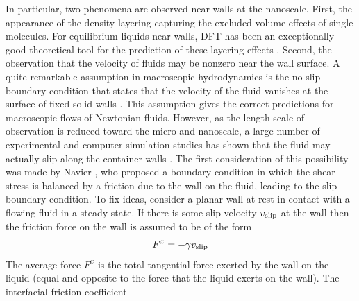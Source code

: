 \documentclass[b5paper,openright,10pt]{book}
\newcommand{\Note}[1]{{\bf \color{red}#1}}    %
\begin{document}
In  particular,  two phenomena  are
observed near  walls at the  nanoscale.  First, the appearance  of the
density  layering  capturing the  excluded  volume  effects of  single
molecules.   For equilibrium  liquids near  walls, 
DFT has  been an exceptionally good theoretical  tool for the
prediction of  these layering effects \cite{Hansen2013}.   Second, the
observation that the velocity of fluids  may be nonzero near the wall
surface.
A quite remarkable  assumption in macroscopic hydrodynamics  is the no
slip boundary  condition that  states that the  velocity of  the fluid
vanishes  at the  surface of  fixed solid  walls \cite{Batcherlor1967}.
This assumption gives the correct predictions for macroscopic flows of
Newtonian  fluids.  However,  as the  length scale  of observation  is
reduced  toward   the  micro  and   nanoscale,  a  large   number  of
experimental   \cite{Lauga2005}   and  computer   simulation   studies
\cite{Koplik1995} has shown that the fluid may actually slip along the
container walls  \cite{KarniadakisBook2005}.  The  first consideration
of this possibility was made  by Navier \cite{Navier1827}, who proposed
a  boundary condition  in  which the  shear stress  is  balanced by  a
friction due  to the wall on  the fluid, leading to  the slip boundary
condition.  To  fix ideas, consider a  planar wall at rest  in contact
with  a flowing  fluid  in a  steady  state.  If  there  is some  slip
velocity $  v_{\rm slip}$ at the  wall then the friction  force on the
wall is assumed to be of the form
\begin{align}
  F^x=-\gamma v_{\rm slip}
\end{align}
The average force  $F^x$ is the total tangential force  exerted by the
wall on  the liquid (equal and  opposite to the force  that the liquid
exerts   on  the   wall).    The   interfacial  friction   coefficient
\end{document}
